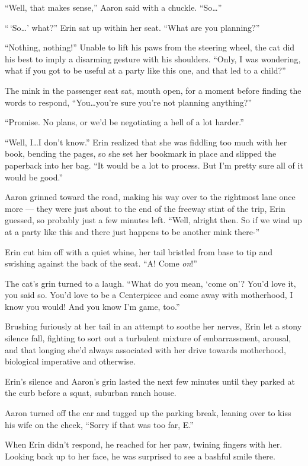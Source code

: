 ``Well, that makes sense,'' Aaron said with a chuckle. ``So\ldots{}''

``\,`So\ldots{}' what?'' Erin sat up within her seat. ``What are you
planning?''

``Nothing, nothing!'' Unable to lift his paws from the steering wheel,
the cat did his best to imply a disarming gesture with his shoulders.
``Only, I was wondering, what if you got to be useful at a party like
this one, and that led to a child?''

The mink in the passenger seat sat, mouth open, for a moment before
finding the words to respond, ``You\ldots{}you're sure you're not
planning anything?''

``Promise. No plans, or we'd be negotiating a hell of a lot harder.''

``Well, I\ldots{}I don't know.'' Erin realized that she was fiddling too
much with her book, bending the pages, so she set her bookmark in place
and slipped the paperback into her bag. ``It would be a lot to process.
But I'm pretty sure all of it would be good.''

Aaron grinned toward the road, making his way over to the rightmost lane
once more --- they were just about to the end of the freeway stint of
the trip, Erin guessed, so probably just a few minutes left. ``Well,
alright then. So if we wind up at a party like this and there just
happens to be another mink there-''

Erin cut him off with a quiet whine, her tail bristled from base to tip
and swishing against the back of the seat. ``A! Come \emph{on}!''

The cat's grin turned to a laugh. ``What do you mean, `come on'? You'd
love it, you said so. You'd love to be a Centerpiece and come away with
motherhood, I know you would! And you know I'm game, too.''

Brushing furiously at her tail in an attempt to soothe her nerves, Erin
let a stony silence fall, fighting to sort out a turbulent mixture of
embarrassment, arousal, and that longing she'd always associated with
her drive towards motherhood, biological imperative and otherwise.

Erin's silence and Aaron's grin lasted the next few minutes until they
parked at the curb before a squat, suburban ranch house.

Aaron turned off the car and tugged up the parking break, leaning over
to kiss his wife on the cheek, ``Sorry if that was too far, E.''

When Erin didn't respond, he reached for her paw, twining fingers with
her. Looking back up to her face, he was surprised to see a bashful
smile there.

